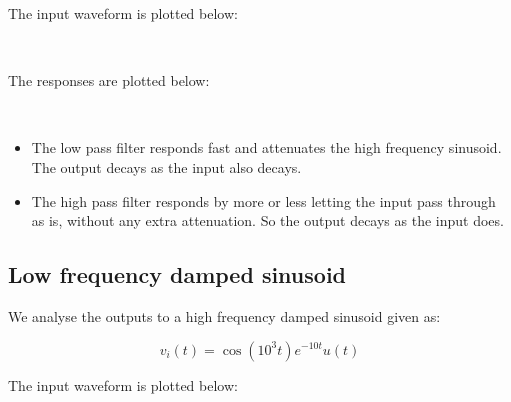 \documentclass[11pt]{article}
\providecommand{\tightlist}{%
      \setlength{\itemsep}{0pt}\setlength{\parskip}{0pt}}
\begin{document}
	

	

	
		
    The input waveform is plotted below:

	

	

    \begin{center}
    \end{center}
    { \hspace*{\fill} \\}
    
	
		
    The responses are plotted below:

	

	

    \begin{center}
    \end{center}
    { \hspace*{\fill} \\}
    
	
		
    \begin{itemize}
\tightlist
\item
  The low pass filter responds fast and attenuates the high frequency
  sinusoid. The output decays as the input also decays.
\item
  The high pass filter responds by more or less letting the input pass
  through as is, without any extra attenuation. So the output decays as
  the input does.
\end{itemize}

	

	
		
    \subsection{Low frequency damped
sinusoid}\label{low-frequency-damped-sinusoid}

We analyse the outputs to a high frequency damped sinusoid given as:

\[v_i(t) = \cos(10^3 t) e^{-10t} u(t)\]

	

	
		
    The input waveform is plotted below:

	
\end{document}
